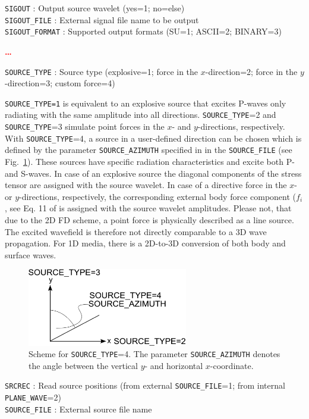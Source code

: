 \texttt{SIGOUT} : Output source wavelet (yes=1; no=else)\\
\texttt{SIGOUT\_FILE} : External signal file name to be output\\
\texttt{SIGOUT\_FORMAT} : Supported output formats (SU=1; ASCII=2; BINARY=3)

\textcolor{red}{\textbf{\dots}}

\texttt{SOURCE\_TYPE} : Source type (explosive=1; force in the $x$-direction=2; force in the $y$-direction=3; custom force=4)

\texttt{SOURCE\_TYPE=1} is equivalent to an explosive source that excites P-waves only radiating with the same amplitude into all directions. \texttt{SOURCE\_TYPE}=2 and \texttt{SOURCE\_TYPE}=3 simulate point forces in the $x$- and $y$-directions, respectively. With \texttt{SOURCE\_TYPE}=4, a source in a user-defined direction can be chosen which is defined by the parameter \texttt{SOURCE\_AZIMUTH} specified in in the \texttt{SOURCE\_FILE} (see Fig.~\ref{fig_source_azimuth}). These sources have specific radiation characteristics and excite both P- and S-waves. In case of an explosive source the diagonal components of the stress tensor are assigned with the source wavelet. In case of a directive force in the $x$- or $y$-directions, respectively, the corresponding external body force component ($f_i$, see Eq. 11 of \citep{bohlen:02} is assigned with the source wavelet amplitudes. Please not, that due to the 2D FD scheme, a point force is physically described as a line source. The excited wavefield is therefore not directly comparable to a 3D wave propagation. For 1D media, there is a 2D-to-3D conversion of both body and surface waves.
\begin{figure}[ht!]
\centering
    \includegraphics[width=7cm,angle=0]{figures/source_azimuth.pdf}
    \caption{Scheme for \texttt{SOURCE\_TYPE}=4. The parameter \texttt{SOURCE\_AZIMUTH} denotes the angle between the vertical $y$- and horizontal $x$-coordinate.}
    \label{fig_source_azimuth}
\end{figure}

\texttt{SRCREC} : Read source positions (from external \texttt{SOURCE\_FILE}=1; from internal \texttt{PLANE\_WAVE}=2)\\
\texttt{SOURCE\_FILE} : External source file name

